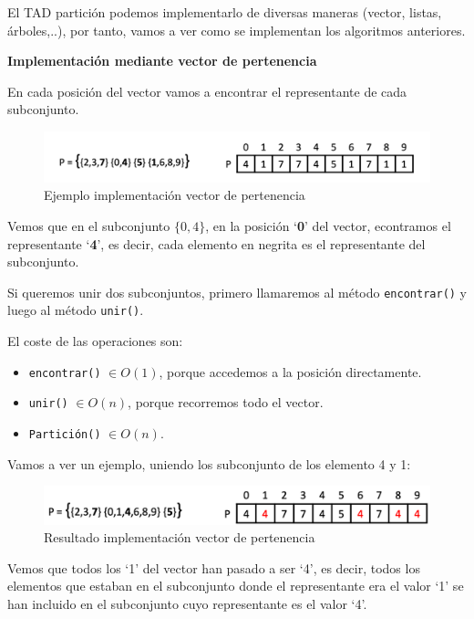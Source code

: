 El TAD partición podemos implementarlo de diversas maneras (vector, listas, árboles,..), por tanto, vamos a ver como se implementan los algoritmos anteriores.

\textbf{Implementación mediante vector de pertenencia}

En cada posición del vector vamos a encontrar el representante de cada subconjunto.
\begin{figure}[h]
  \begin{center}
    \includegraphics[width=\textwidth]{assets/impPAR1.png}
  \end{center}
  \caption{Ejemplo implementación vector de pertenencia}
\end{figure}

Vemos que en el subconjunto \(\{0,4\}\), en la posición `\textbf{0}' del vector, econtramos el representante `\textbf{4}', es decir, cada elemento en negrita es el representante del subconjunto.

Si queremos unir dos subconjuntos, primero llamaremos al método \texttt{encontrar()} y luego al método \texttt{unir()}.

El coste de las operaciones son:
\begin{itemize}
  \item \texttt{encontrar()} \(\in O(1)\), porque accedemos a la posición directamente.
  \item \texttt{unir()} \(\in O(n)\), porque recorremos todo el vector.
  \item \texttt{Partición()} \(\in O(n)\).
\end{itemize}
\newpage
Vamos a ver un ejemplo, uniendo los subconjunto de los elemento 4 y 1:
\begin{figure}[h]
  \begin{center}
    \includegraphics[width=\textwidth]{assets/impPAR2.png}
  \end{center}
  \caption{Resultado implementación vector de pertenencia}
\end{figure}

Vemos que todos los `1' del vector han pasado a ser `4', es decir, todos los elementos que estaban en el subconjunto donde el representante era el valor `1' se han incluido en el subconjunto cuyo representante es el valor `4'.

